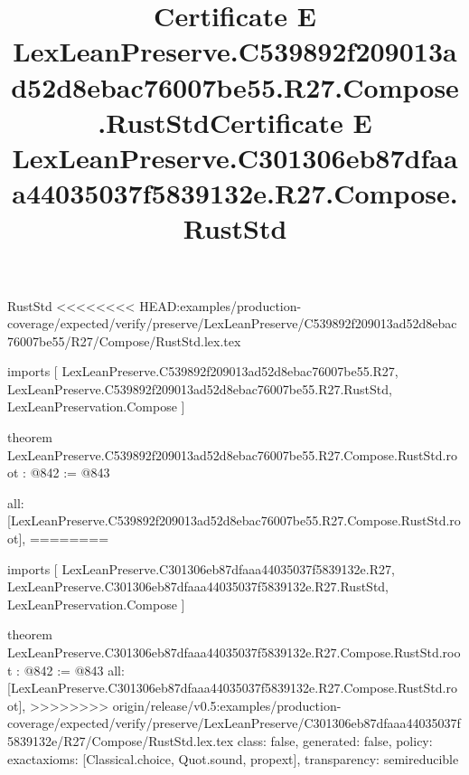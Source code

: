 \begin{lexlean}{RustStd}
<<<<<<<< HEAD:examples/production-coverage/expected/verify/preserve/LexLeanPreserve/C539892f209013ad52d8ebac76007be55/R27/Compose/RustStd.lex.tex
\title{Certificate E LexLeanPreserve.C539892f209013ad52d8ebac76007be55.R27.Compose.RustStd}
\begin{coremodule}
imports [
  LexLeanPreserve.C539892f209013ad52d8ebac76007be55.R27,
  LexLeanPreserve.C539892f209013ad52d8ebac76007be55.R27.RustStd,
  LexLeanPreservation.Compose
]

theorem LexLeanPreserve.C539892f209013ad52d8ebac76007be55.R27.Compose.RustStd.root : @842 := @843 {
  all: [LexLeanPreserve.C539892f209013ad52d8ebac76007be55.R27.Compose.RustStd.root],
========
\title{Certificate E LexLeanPreserve.C301306eb87dfaaa44035037f5839132e.R27.Compose.RustStd}
\begin{coremodule}
imports [
  LexLeanPreserve.C301306eb87dfaaa44035037f5839132e.R27,
  LexLeanPreserve.C301306eb87dfaaa44035037f5839132e.R27.RustStd,
  LexLeanPreservation.Compose
]

theorem LexLeanPreserve.C301306eb87dfaaa44035037f5839132e.R27.Compose.RustStd.root : @842 := @843 {
  all: [LexLeanPreserve.C301306eb87dfaaa44035037f5839132e.R27.Compose.RustStd.root],
>>>>>>>> origin/release/v0.5:examples/production-coverage/expected/verify/preserve/LexLeanPreserve/C301306eb87dfaaa44035037f5839132e/R27/Compose/RustStd.lex.tex
  class: false,
  generated: false,
  policy: exact{axioms: [Classical.choice, Quot.sound, propext]},
  transparency: semireducible
}


\end{coremodule}}
\end{coremodule}
\end{lexlean}
